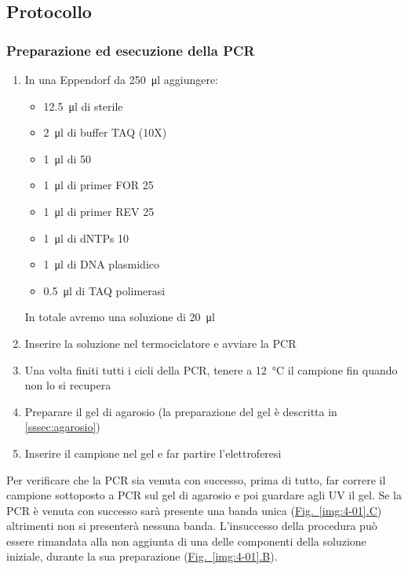 \subsection{Protocollo}
\subsubsection{Preparazione ed esecuzione della PCR }
\begin{enumerate}
	\item In una Eppendorf da \qty{250}{\micro\litre} aggiungere:
	      \begin{itemize}[person]
		      \item \qty{12.5}{\micro\litre} di  sterile
		      \item \qty{2}{\micro\litre} di buffer TAQ (10X)
		      \item \qty{1}{\micro\litre} di  \qty{50}{\milli\Molar}
		      \item \qty{1}{\micro\litre} di primer FOR \qty{25}{\milli\Molar}
		      \item \qty{1}{\micro\litre} di primer REV \qty{25}{\milli\Molar}
		      \item \qty{1}{\micro\litre} di dNTPs \qty{10}{\milli\Molar}
		      \item \qty{1}{\micro\litre} di DNA plasmidico
		      \item \qty{0.5}{\micro\litre} di TAQ polimerasi
	      \end{itemize}
	      In totale avremo una soluzione di \qty{20}{\micro\litre}
	\item Inserire la soluzione nel termociclatore e avviare la PCR
	\item Una volta finiti tutti i cicli della PCR, tenere a \qty{12}{\celsius} il campione fin quando non lo si recupera
	\item Preparare il gel di agarosio (la preparazione del gel è descritta in \ref{sssec:agarosio})
	\item Inserire il campione nel gel e far partire l'elettroferesi
\end{enumerate}

Per verificare che la PCR sia venuta con successo, prima di tutto, far correre il campione sottoposto a PCR sul gel di agarosio e poi guardare agli UV il gel. Se la PCR è venuta con successo sarà presente una banda unica (\hyperref[img:4-01]{Fig.~\ref{img:4-01}.C}) altrimenti non si presenterà nessuna banda. L'insuccesso della procedura può essere rimandata alla non aggiunta di una delle componenti della soluzione iniziale, durante la sua preparazione (\hyperref[img:4-01]{Fig.~\ref{img:4-01}.B}).

